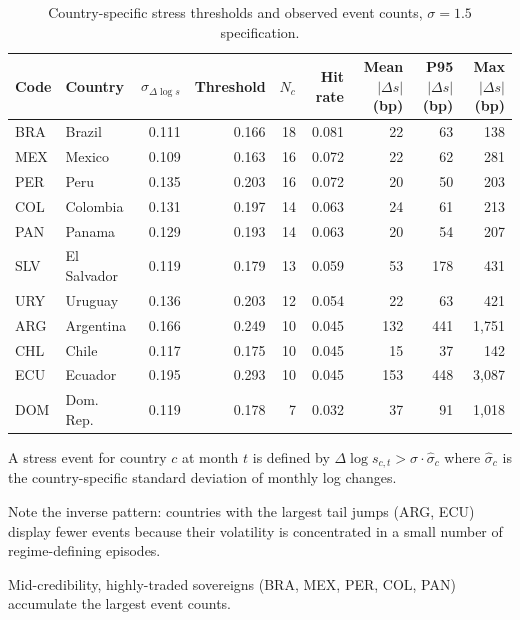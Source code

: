 \begin{table}[!htbp]
\centering
\footnotesize
\begin{threeparttable}
\caption{Country-specific stress thresholds and observed event counts, $\sigma=1.5$ specification.}
\label{tab:country_thresholds}
\begin{tabular}{llrrrrrrr}
\toprule
Code & Country & $\sigma_{\Delta\log s}$ & Threshold & $N_c$ & Hit rate & Mean $|\Delta s|$ (bp) & P95 $|\Delta s|$ (bp) & Max $|\Delta s|$ (bp) \\
\midrule
BRA & Brazil & 0.111 & 0.166 & 18 & 0.081 & 22 & 63 & 138 \\
MEX & Mexico & 0.109 & 0.163 & 16 & 0.072 & 22 & 62 & 281 \\
PER & Peru & 0.135 & 0.203 & 16 & 0.072 & 20 & 50 & 203 \\
COL & Colombia & 0.131 & 0.197 & 14 & 0.063 & 24 & 61 & 213 \\
PAN & Panama & 0.129 & 0.193 & 14 & 0.063 & 20 & 54 & 207 \\
SLV & El Salvador & 0.119 & 0.179 & 13 & 0.059 & 53 & 178 & 431 \\
URY & Uruguay & 0.136 & 0.203 & 12 & 0.054 & 22 & 63 & 421 \\
ARG & Argentina & 0.166 & 0.249 & 10 & 0.045 & 132 & 441 & 1,751 \\
CHL & Chile & 0.117 & 0.175 & 10 & 0.045 & 15 & 37 & 142 \\
ECU & Ecuador & 0.195 & 0.293 & 10 & 0.045 & 153 & 448 & 3,087 \\
DOM & Dom. Rep. & 0.119 & 0.178 & 7 & 0.032 & 37 & 91 & 1,018 \\
\bottomrule
\end{tabular}
\begin{tablenotes}\footnotesize
\item A stress event for country $c$ at month $t$ is defined by $\Delta\log s_{c,t} > \sigma\cdot\hat{\sigma}_c$ where $\hat{\sigma}_c$ is the country-specific standard deviation of monthly log changes.
\item Note the inverse pattern: countries with the largest tail jumps (ARG, ECU) display fewer events because their volatility is concentrated in a small number of regime-defining episodes.
\item Mid-credibility, highly-traded sovereigns (BRA, MEX, PER, COL, PAN) accumulate the largest event counts.
\end{tablenotes}
\end{threeparttable}
\end{table}
